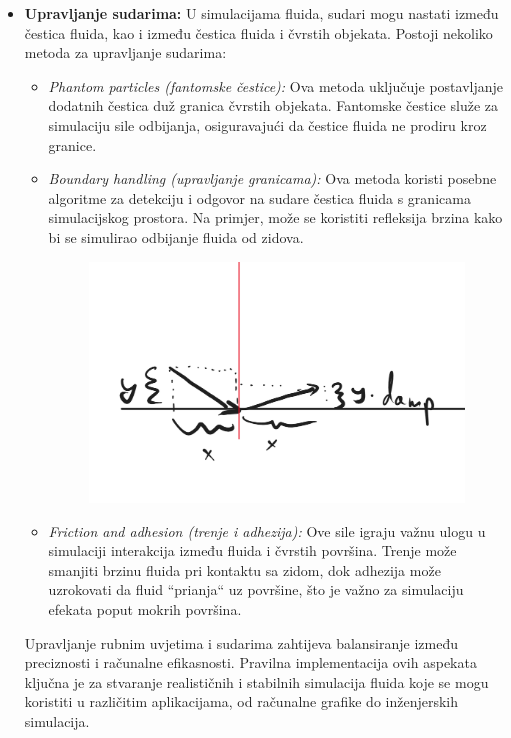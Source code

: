 \documentclass[diplomskirad]{fer}
\begin{document}
\begin{itemize}
        \item \textbf{Upravljanje sudarima:} U simulacijama fluida, sudari mogu nastati između čestica fluida, kao i između čestica fluida i čvrstih objekata. Postoji nekoliko metoda za upravljanje sudarima:
        \begin{itemize}
            \item \textit{Phantom particles (fantomske čestice):} Ova metoda uključuje postavljanje dodatnih čestica duž granica čvrstih objekata. Fantomske čestice služe za simulaciju sile odbijanja, osiguravajući da čestice fluida ne prodiru kroz granice.
            \item \textit{Boundary handling (upravljanje granicama):} Ova metoda koristi posebne algoritme za detekciju i odgovor na sudare čestica fluida s granicama simulacijskog prostora. Na primjer, može se koristiti refleksija brzina kako bi se simulirao odbijanje fluida od zidova.
            \begin{figure}[H]
                \centering
                \includegraphics[scale=0.3]{images/dampening}
                \label{fig:dampening}
            \end{figure}
            \item \textit{Friction and adhesion (trenje i adhezija):} Ove sile igraju važnu ulogu u simulaciji interakcija između fluida i čvrstih površina. Trenje može smanjiti brzinu fluida pri kontaktu sa zidom, dok adhezija može uzrokovati da fluid ``prianja`` uz površine, što je važno za simulaciju efekata poput mokrih površina.
        \end{itemize}

        Upravljanje rubnim uvjetima i sudarima zahtijeva balansiranje između preciznosti i računalne efikasnosti.
        Pravilna implementacija ovih aspekata ključna je za stvaranje realističnih i stabilnih simulacija fluida koje se mogu koristiti u različitim aplikacijama, od računalne grafike do inženjerskih simulacija.


    \end{itemize}
\end{document}
